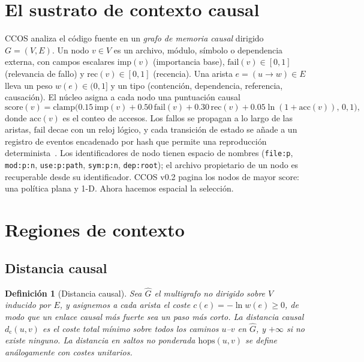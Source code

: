 \documentclass[11pt]{article}
\newtheorem{definition}{Definición}
\newcommand{\dcausal}{d_{\mathrm{c}}}
\newcommand{\code}[1]{\texttt{#1}}
\begin{document}
\section{El sustrato de contexto causal}\label{sec:substrate}

CCOS analiza el código fuente en un \emph{grafo de memoria causal} dirigido $G=(V,E)$.
Un nodo $v\in V$ es un archivo, módulo, símbolo o dependencia externa, con campos
escalares $\mathrm{imp}(v)$ (importancia base), $\mathrm{fail}(v)\in[0,1]$ (relevancia
de fallo) y $\mathrm{rec}(v)\in[0,1]$ (recencia). Una arista $e=(u\!\to\!w)\in E$ lleva
un peso $w(e)\in(0,1]$ y un tipo (contención, dependencia, referencia, causación). El
núcleo asigna a cada nodo una puntuación causal
\begin{equation}
\mathrm{score}(v) = \mathrm{clamp}\big(0.15\,\mathrm{imp}(v) + 0.50\,\mathrm{fail}(v)
  + 0.30\,\mathrm{rec}(v) + 0.05\ln(1{+}\mathrm{acc}(v)),\,0,1\big),
\label{eq:score}
\end{equation}
donde $\mathrm{acc}(v)$ es el conteo de accesos. Los fallos se propagan a lo largo de
las aristas, $\mathrm{fail}$ decae con un reloj lógico, y cada transición de estado se
añade a un registro de eventos encadenado por hash que permite una reproducción
determinista~\cite{haber1991timestamp}. Los identificadores de nodo tienen espacio de
nombres (\code{file:p}, \code{mod:p:n}, \code{use:p:path}, \code{sym:p:n},
\code{dep:root}); el archivo propietario de un nodo es recuperable desde su
identificador. CCOS v0.2 pagina los nodos de mayor $\mathrm{score}$: una política
plana y 1-D. Ahora hacemos espacial la selección.

\section{Regiones de contexto}\label{sec:regions}

\subsection{Distancia causal}

\begin{definition}[Distancia causal]
Sea $\hat G$ el multigrafo no dirigido sobre $V$ inducido por $E$, y asignemos a cada
arista el coste $c(e) = -\ln w(e) \ge 0$, de modo que un enlace causal más fuerte sea
un paso más corto. La \emph{distancia causal} $\dcausal(u,v)$ es el coste total mínimo
sobre todos los caminos $u$--$v$ en $\hat G$, y $+\infty$ si no existe ninguno. La
distancia en saltos no ponderada $\mathrm{hops}(u,v)$ se define análogamente con
costes unitarios.
\end{definition}
\end{document}
